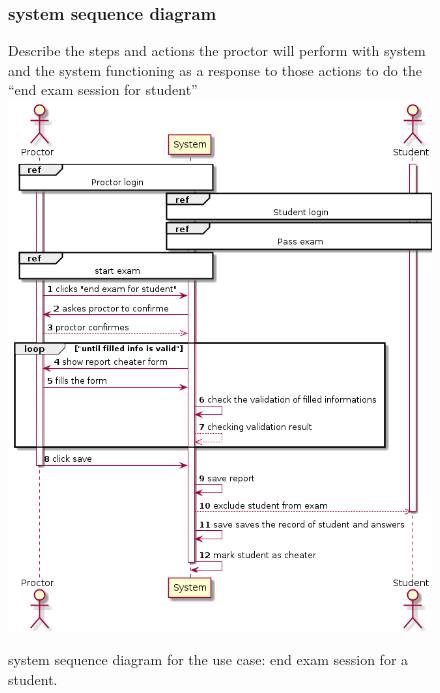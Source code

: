 \documentclass[]{uc2pfecaneva}
\begin{document}
    \begin{figure}[h]
        \subsubsection{system sequence diagram}
        Describe the steps and actions the proctor will perform with system and the system functioning
        as a response to those actions to do the “end exam session for student”
        \centering
        \includegraphics[width=\textwidth]{images/End_exam_for_student}

        \caption{system sequence diagram for the use case: end exam session for a student.}
    \end{figure}
    \clearpage
\end{document}
